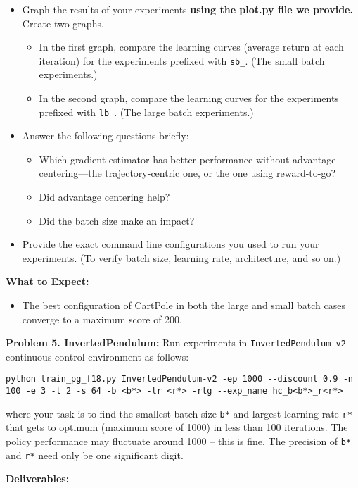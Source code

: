 \documentclass[12pt]{article}
\begin{document}
\begin{itemize}
\item Graph the results of your experiments \textbf{using the plot.py file we provide.} Create two graphs. 
\begin{itemize}
\item In the first graph, compare the learning curves (average return at each iteration) for the experiments prefixed with \verb|sb_|. (The small batch experiments.)
\item In the second graph, compare the learning curves for the experiments prefixed with \verb|lb_|. (The large batch experiments.)
\end{itemize}
\item Answer the following questions briefly: 
\begin{itemize}
\item Which gradient estimator has better performance without advantage-centering---the trajectory-centric one, or the one using reward-to-go? 
\item Did advantage centering help?
\item Did the batch size make an impact?
\end{itemize}
\item Provide the exact command line configurations you used to run your experiments. (To verify batch size, learning rate, architecture, and so on.)
\end{itemize}

\textbf{What to Expect:}
\begin{itemize}
\item The best configuration of CartPole in both the large and small batch cases converge to a maximum score of 200.
\end{itemize}


\textbf{Problem 5. InvertedPendulum:} Run experiments in \verb|InvertedPendulum-v2| continuous control environment as follows:
\begin{lstlisting}
python train_pg_f18.py InvertedPendulum-v2 -ep 1000 --discount 0.9 -n 100 -e 3 -l 2 -s 64 -b <b*> -lr <r*> -rtg --exp_name hc_b<b*>_r<r*>
\end{lstlisting}
where your task is to find the smallest batch size \texttt{b*} and largest learning rate \texttt{r*} that gets to optimum (maximum score of 1000) in less than 100 iterations. The policy performance may fluctuate around 1000 -- this is fine. The precision of \texttt{b*} and \texttt{r*} need only be one significant digit.

\textbf{Deliverables:}
\end{document}
